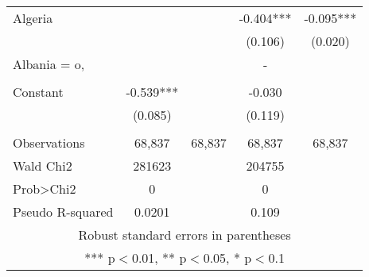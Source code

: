 \documentclass[]{article}
\begin{document}
\begin{tabular}{lcccc}
Algeria &  &  & -0.404*** & -0.095*** \\
 &  &  & (0.106) & (0.020) \\
Albania = o, &  &  & - &  \\
 &  &  &  &  \\
Constant & -0.539*** &  & -0.030 &  \\
 & (0.085) &  & (0.119) &  \\
 &  &  &  &  \\
Observations & 68,837 & 68,837 & 68,837 & 68,837 \\
Wald Chi2 & 281623 &  & 204755 &  \\
Prob>Chi2 & 0 &  & 0 &  \\
 Pseudo R-squared & 0.0201 &  & 0.109 &  \\ \hline
\multicolumn{5}{c}{ Robust standard errors in parentheses} \\
\multicolumn{5}{c}{ *** p$<$0.01, ** p$<$0.05, * p$<$0.1} \\
\end{tabular}
\end{document}
